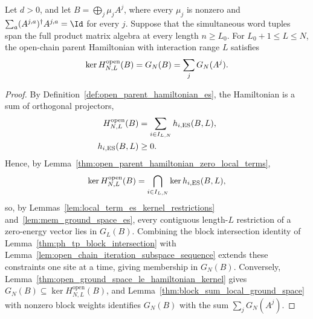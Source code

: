 \begin{lemma}
    \label{thm:ph_tp_block_open_ground_space}
    \leanok
    Let $d>0$, and let $B=\bigoplus_j\mu_j A^j$, where every $\mu_j$ is nonzero
    and $\sum_a(A^{j,a})^\dagger A^{j,a}=\Id$ for every $j$.
    Suppose that the simultaneous word tuples span the full product matrix
    algebra at every length $n\ge L_0$. For $L_0+1\le L\le N$, the
    open-chain parent Hamiltonian with interaction range $L$ satisfies
    \begin{align}
        \ker H^{\mathrm{open}}_{N,L}(B)=G_N(B)=\sum_jG_N(A^j).
        \notag
    \end{align}
\end{lemma}
\begin{proof}
    \leanok
    By Definition~\ref{def:open_parent_hamiltonian_es}, the Hamiltonian is a
    sum of orthogonal projectors,
    \begin{align}
        H^{\mathrm{open}}_{N,L}(B) & =\sum_{i\in I_{L,N}}h_{i,\mathrm{ES}}(B,L),
        \notag                                                                   \\
        h_{i,\mathrm{ES}}(B,L)     & \ge0.
        \notag
    \end{align}
    Hence, by Lemma~\ref{thm:open_parent_hamiltonian_zero_local_terms},
    \begin{align}
        \ker H^{\mathrm{open}}_{N,L}(B)
        =\bigcap_{i\in I_{L,N}}\ker h_{i,\mathrm{ES}}(B,L),
        \notag
    \end{align}
    so, by Lemmas~\ref{lem:local_term_es_kernel_restrictions}
    and~\ref{lem:mem_ground_space_es}, every contiguous length-$L$ restriction
    of a zero-energy vector lies in $G_L(B)$. Combining the block intersection
    identity of Lemma~\ref{thm:ph_tp_block_intersection} with
    Lemma~\ref{lem:open_chain_iteration_subspace_sequence} extends these
    constraints one site at a time, giving membership in $G_N(B)$. Conversely,
    Lemma~\ref{thm:open_ground_space_le_hamiltonian_kernel} gives
    $G_N(B)\subseteq\ker H^{\mathrm{open}}_{N,L}(B)$, and
    Lemma~\ref{thm:block_sum_local_ground_space} with nonzero block weights
    identifies $G_N(B)$ with the sum $\sum_jG_N(A^j)$.
\end{proof}

